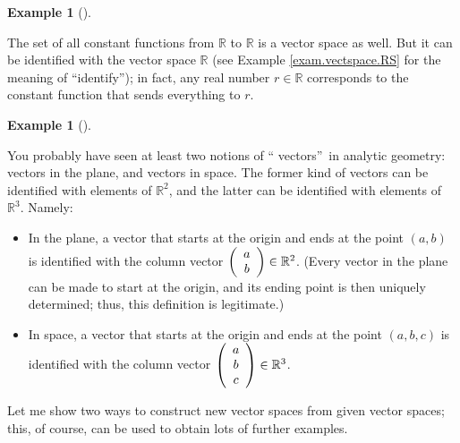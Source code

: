 \documentclass[numbers=enddot,12pt,final,onecolumn,notitlepage]{scrartcl}%
\theoremstyle{definition}
\newtheorem{exam}[theo]{Example}
\newenvironment{example}[1][]
{\begin{exam}[#1]\begin{leftbar}}
{\end{leftbar}\end{exam}}
\begin{document}
\begin{example}
The set of all constant functions from $\mathbb{R}$ to $\mathbb{R}$ is a
vector space as well. But it can be identified with the vector space
$\mathbb{R}$ (see Example \ref{exam.vectspace.RS} for the meaning of
\textquotedblleft identify\textquotedblright); in fact, any real number
$r\in\mathbb{R}$ corresponds to the constant function that sends everything to
$r$.
\end{example}

\begin{example}
You probably have seen at least two notions of \textquotedblleft
vectors\textquotedblright\ in analytic geometry: vectors in the plane, and
vectors in space. The former kind of vectors can be identified with elements
of $\mathbb{R}^{2}$, and the latter can be identified with elements of
$\mathbb{R}^{3}$. Namely:

\begin{itemize}
\item In the plane, a vector that starts at the origin and ends at the point
$\left(  a,b\right)  $ is identified with the column vector $\left(
\begin{array}
[c]{c}%
a\\
b
\end{array}
\right)  \in\mathbb{R}^{2}$. (Every vector in the plane can be made to start
at the origin, and its ending point is then uniquely determined; thus, this
definition is legitimate.)

\item In space, a vector that starts at the origin and ends at the point
$\left(  a,b,c\right)  $ is identified with the column vector $\left(
\begin{array}
[c]{c}%
a\\
b\\
c
\end{array}
\right)  \in\mathbb{R}^{3}$.
\end{itemize}
\end{example}

Let me show two ways to construct new vector spaces from given vector spaces;
this, of course, can be used to obtain lots of further examples.
\end{document}
